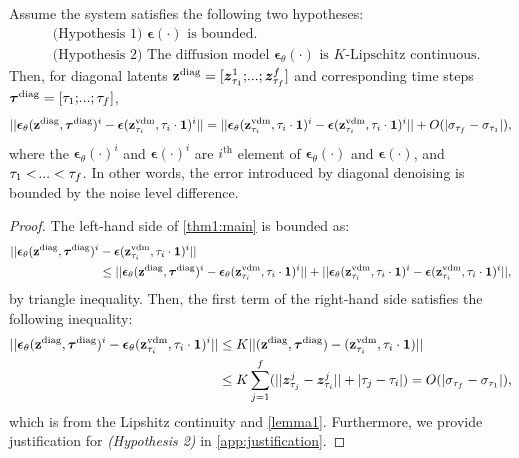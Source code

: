 \begin{theorem} \label{thm1}
    Assume the system satisfies the following two hypotheses:
    \begin{align*}
        &\text{(Hypothesis 1) $\bm{\epsilon}(\cdot)$ is bounded.} \\
        &\text{(Hypothesis 2) The diffusion model $\bm{\epsilon}_\theta(\cdot)$ is $K$-Lipschitz continuous.}
    \end{align*}
    Then, for diagonal latents $\z^{\text{diag}} = [\gz_{\tau_1}^1;\text{\myldots};\gz_{\tau_f}^f]$ and corresponding time steps $\bm{\tau}^{\text{diag}}=[\tau_1;\text{\myldots};\tau_f]$,
    \begin{align} 
        ||\bm\epsilon_\theta(\mathbf{z}^{\text{diag}}, \bm{\tau}^\text{diag})^i - \bm\epsilon(\mathbf{z}^{\text{vdm}}_{\tau_i}, \tau_i\cdot\bm{1})^i||   
        = ||\bm\epsilon_\theta(\mathbf{z}^{\text{vdm}}_{\tau_i}, \tau_i\cdot\bm{1})^i - \bm\epsilon(\mathbf{z}^{\text{vdm}}_{\tau_i}, \tau_i\cdot\bm{1})^i|| + O(|\sigma_{\tau_f} - \sigma_{\tau_1}|),  \label{thm1:main} 
    \end{align}
    where the $\bm\epsilon_\theta(\cdot)^i$ and $\bm\epsilon(\cdot)^i$ are $i^\text{th}$ element of $\bm\epsilon_\theta(\cdot)$ and $\bm\epsilon(\cdot)$, and $\tau_1<\text{\myldots}<\tau_f$.
    In other words, the error introduced by diagonal denoising is bounded by the noise level difference.
\end{theorem}
\begin{proof}
    The left-hand side of \cref{thm1:main} is bounded as:
    \begin{align*}
        ||\bm\epsilon_\theta(\mathbf{z}^{\text{diag}}, \bm{\tau}^\text{diag})^i &- \bm\epsilon(\mathbf{z}^{\text{vdm}}_{\tau_i}, \tau_i\cdot\bm{1})^i|| \\
        &\leq  
        ||\bm\epsilon_\theta(\mathbf{z}^{\text{diag}}, \bm{\tau}^\text{diag})^i - \bm\epsilon_\theta(\mathbf{z}_{\tau_i}^{\text{vdm}}, \tau_i \cdot \bm{1})^i||
        + ||\bm\epsilon_\theta(\mathbf{z}_{\tau_i}^{\text{vdm}}, \tau_i \cdot \bm{1})^i - \bm\epsilon(\mathbf{z}^{\text{vdm}}_{\tau_i}, \tau_i\cdot\bm{1})^i||,
    \end{align*}
    by triangle inequality. 
    Then, the first term of the right-hand side satisfies the following inequality:
    \begin{align*}
        ||\bm\epsilon_\theta (\mathbf{z}^{\text{diag}}, \bm{\tau}^\text{diag})^i - \bm\epsilon_\theta(\mathbf{z}_{\tau_i}^{\text{vdm}}, \tau_i \cdot \bm{1})^i||
        &\leq K||(\mathbf{z}^{\text{diag}}, \bm{\tau}^\text{diag}) - (\mathbf{z}^\text{vdm}_{\tau_i}, \tau_i \cdot \bm{1})|| \\
        &\leq K \sum_{j=1}^{f} (|| \bm{z}_{\tau_j}^j - \bm{z}_{\tau_i}^j || + |\tau_j - \tau_i|) 
        = O(|\sigma_{\tau_f} - \sigma_{\tau_1}|),
    \end{align*}
    which is from the Lipshitz continuity and \cref{lemma1}. 
    Furthermore, we provide justification for \textit{(Hypothesis 2)} in \cref{app:justification}.
\end{proof}

